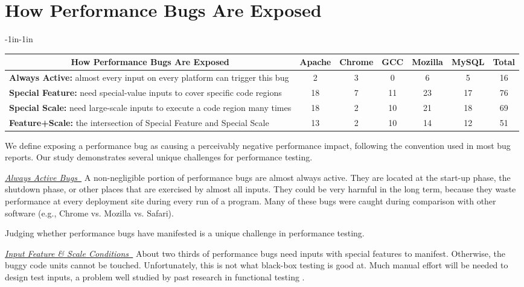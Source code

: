 \section{How Performance Bugs Are Exposed}
\label{sec:3_exp}

\begin{table*}[tb!]
\begin{adjustwidth}{-1in}{-1in}
\scriptsize
\centering
{
\begin{tabular}{lcccccc}
\toprule
\multicolumn{1}{c}{\bf How Performance Bugs Are Exposed} &Apache&Chrome&GCC&Mozilla&MySQL&Total\\
\midrule
\multicolumn{1}{l}{{\bf Always Active:} almost every input on every platform can trigger this bug}
&2&3&0&6&5&16\\
\midrule
\multicolumn{1}{l}{{\bf Special Feature:} need special-value inputs to cover specific code regions}
&18&7&11&23&17&76\\
\midrule
\multicolumn{1}{l}{{\bf Special Scale:} need large-scale inputs to execute a code region many times}
&18&2&10&21&18&69\\
\midrule
\multicolumn{1}{l}{{\bf Feature+Scale:} the intersection of Special Feature and Special Scale}
&13&2&10&14&12&51\\
\bottomrule
\end{tabular}
}
\end{adjustwidth}
\caption{How performance bugs are exposed in Section~\ref{sec:3_exp}}
\label{tab:3_exp}
\end{table*}


We define exposing a performance bug as causing a perceivably negative performance impact, 
following the convention used in most bug reports. Our study demonstrates several unique challenges for performance testing.

\underline{\it Always Active Bugs\ } 
A non-negligible portion of performance bugs are almost always active.
They are located at the start-up phase, the shutdown phase, or other places 
that are exercised by almost all inputs. 
They could be very harmful in the long term, because
they waste performance at every deployment site during every run of a program.
Many of these bugs were caught during comparison with other software
(e.g., Chrome vs. Mozilla vs. Safari).

Judging whether performance bugs have manifested is a unique challenge in 
performance testing.

\underline{\it Input Feature \& Scale Conditions\ } 
About two thirds of performance bugs need inputs with special features
to manifest. Otherwise, the buggy code units cannot be touched.
Unfortunately, this is not what black-box testing is good at.
Much manual effort will be needed to design test inputs, a problem
well studied by past research in functional testing \citep{KLEE,s2e}.


